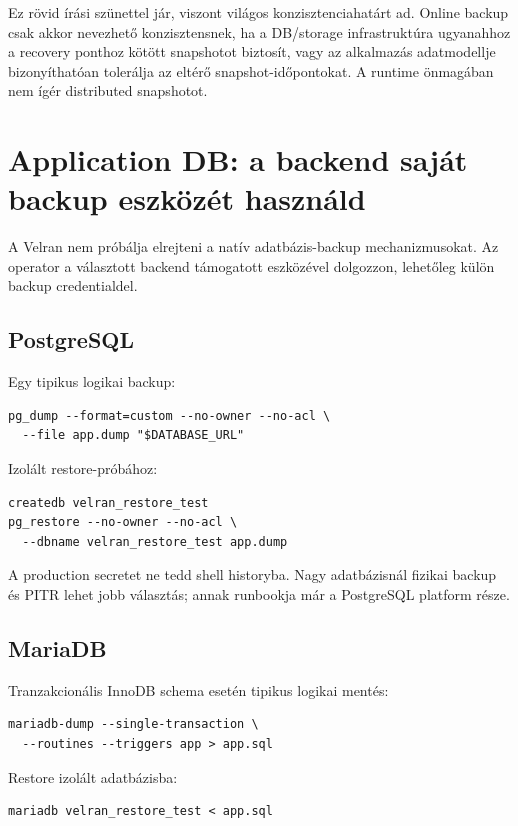 Ez rövid írási szünettel jár, viszont világos konzisztenciahatárt ad. Online backup csak akkor nevezhető konzisztensnek, ha a DB/storage infrastruktúra ugyanahhoz a recovery ponthoz kötött snapshotot biztosít, vagy az alkalmazás adatmodellje bizonyíthatóan tolerálja az eltérő snapshot-időpontokat. A runtime önmagában nem ígér distributed snapshotot.

\section{Application DB: a backend saját backup eszközét használd}

A Velran nem próbálja elrejteni a natív adatbázis-backup mechanizmusokat. Az operator a választott backend támogatott eszközével dolgozzon, lehetőleg külön backup credentialdel.

\subsection*{PostgreSQL}

Egy tipikus logikai backup:

\begin{lstlisting}
pg_dump --format=custom --no-owner --no-acl \
  --file app.dump "$DATABASE_URL"
\end{lstlisting}

Izolált restore-próbához:

\begin{lstlisting}
createdb velran_restore_test
pg_restore --no-owner --no-acl \
  --dbname velran_restore_test app.dump
\end{lstlisting}

A production secretet ne tedd shell historyba. Nagy adatbázisnál fizikai backup és PITR lehet jobb választás; annak runbookja már a PostgreSQL platform része.

\subsection*{MariaDB}

Tranzakcionális InnoDB schema esetén tipikus logikai mentés:

\begin{lstlisting}
mariadb-dump --single-transaction \
  --routines --triggers app > app.sql
\end{lstlisting}

Restore izolált adatbázisba:

\begin{lstlisting}
mariadb velran_restore_test < app.sql
\end{lstlisting}

